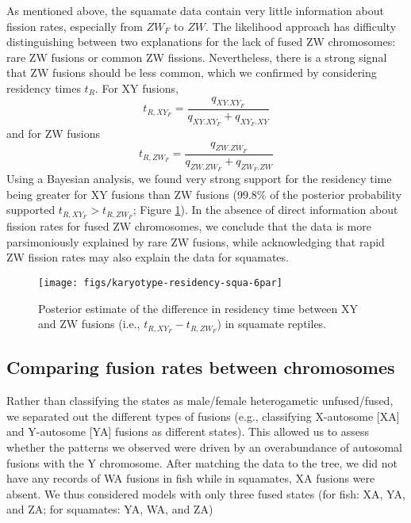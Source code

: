 As mentioned above, the squamate data contain very little information about fission rates, especially from $ZW_F$ to $ZW$. The likelihood approach has difficulty distinguishing between two explanations for the lack of fused ZW chromosomes: rare ZW fusions or common ZW fissions. Nevertheless, there is a strong signal that ZW fusions should be less common, which we confirmed by considering residency times $t_R$. For XY fusions,
\begin{equation}
t_{R,XY_F} = \frac{q_{XY.XY_F}}{q_{XY.XY_F} + q_{XY_F.XY}}
\end{equation}
and for ZW fusions
\begin{equation}
t_{R,ZW_F} = \frac{q_{ZW.ZW_F}}{q_{ZW.ZW_F} + q_{ZW_F.ZW}}
\end{equation}
Using a Bayesian analysis, we found very strong support for the residency time being greater for XY fusions than ZW fusions (99.8\% of the posterior probability supported $t_{R,XY_F} > t_{R,ZW_F}$; Figure \ref{fig:squa-resid}). In the absence of direct information about fission rates for fused ZW chromosomes, we conclude that the data is more parsimoniously explained by rare ZW fusions, while acknowledging that rapid ZW fission rates may also explain the data for squamates.

\begin{figure}[p]
\centering
\texttt{[image: figs/karyotype-residency-squa-6par]}
\caption[Fusion residency time in squamates]{Posterior estimate of the difference in residency time between XY and ZW fusions (i.e., $t_{R,XY_F} - t_{R,ZW_F}$) in squamate reptiles.}
\label{fig:squa-resid}
\end{figure}


\subsection{Comparing fusion rates between chromosomes} 

Rather than classifying the states as male/female heterogametic unfused/fused, we separated out the different types of fusions (e.g., classifying X-autosome [XA] and Y-autosome [YA] fusions as different states). This allowed us to assess whether the patterns we observed were driven by an overabundance of autosomal fusions with the Y chromosome. After matching the data to the tree, we did not have any records of WA fusions in fish while in squamates, XA fusions were absent. We thus considered models with only three fused states (for fish: XA, YA, and ZA; for squamates: YA, WA, and ZA)

